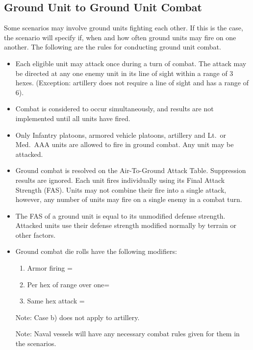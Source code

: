 \subsection{Ground Unit to Ground Unit Combat} Some scenarios may involve ground units fighting each other. If this is the case, the scenario will specify if, when and how often ground units may fire on one another. The following are the rules for conducting ground unit combat.
\begin{itemize}

    \item Each eligible unit may attack once during a turn of combat. The attack may be directed at any one enemy unit in its line of sight within a range of 3 hexes. (Exception: artillery does not require a line of sight and has a range of 6).

    \item Combat is considered to occur simultaneously, and results are not implemented until all units have fired.

    \item Only Infantry platoons, armored vehicle platoons, artillery and Lt.\ or Med.\ AAA units are allowed to fire in ground combat. Any unit may be attacked.

    \item Ground combat is resolved on the Air-To-Ground Attack Table. Suppression results are ignored. Each unit fires individually using its Final Attack Strength (FAS). Units may not combine their fire into a single attack, however, any number of units may fire on a single enemy in a combat turn.

    \item The FAS of a ground unit is equal to its unmodified defense strength. Attacked units use their defense strength modified normally by terrain or other factors.

    \item Ground combat die rolls have the following modifiers:
        \begin{enumerate}
        \item[a)] Armor firing = 
    \item[b)] Per hex of range over one= 
\item[c)] Same hex attack = 
\end{enumerate}

Note: Case b) does not apply to artillery.

Note: Naval vessels will have any necessary combat rules given for them in the scenarios.

\end{itemize}

